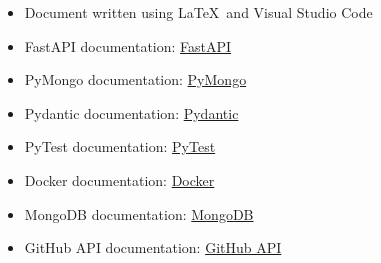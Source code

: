 \clearpage
{}
\label{sect:effort}

\clearpage
{}


\begin{itemize}
        \item Document written using \LaTeX  \ and Visual Studio Code
        \item FastAPI documentation: \href{https://fastapi.tiangolo.com/}{FastAPI}
        \item PyMongo documentation: \href{https://pymongo.readthedocs.io/en/stable/}{PyMongo}
        \item Pydantic documentation: \href{https://pydantic-docs.helpmanual.io/}{Pydantic}
        \item PyTest documentation: \href{https://docs.pytest.org/en/6.2.x/}{PyTest}
        \item Docker documentation: \href{https://docs.docker.com/}{Docker}
        \item MongoDB documentation: \href{https://docs.mongodb.com/}{MongoDB}
        \item GitHub API documentation: \href{https://docs.github.com/en/rest}{GitHub API}
\end{itemize}

